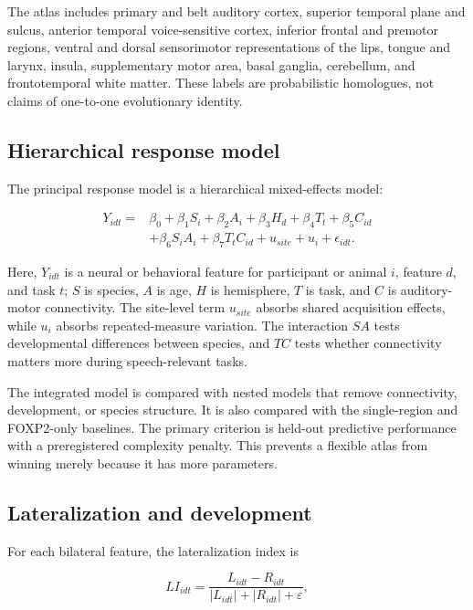 \documentclass[conference]{IEEEtran}
\begin{document}
The atlas includes primary and belt auditory cortex, superior temporal plane and sulcus, anterior temporal voice-sensitive cortex, inferior frontal and premotor regions, ventral and dorsal sensorimotor representations of the lips, tongue and larynx, insula, supplementary motor area, basal ganglia, cerebellum, and frontotemporal white matter. These labels are probabilistic homologues, not claims of one-to-one evolutionary identity.

\subsection{Hierarchical response model}

The principal response model is a hierarchical mixed-effects model:

\begin{equation}
\begin{aligned}
Y_{idt}={}&\beta_0+\beta_1 S_i+\beta_2 A_i+\beta_3 H_d+\beta_4 T_t+\beta_5 C_{id}\\
&+\beta_6 S_iA_i+\beta_7 T_tC_{id}+u_{site}+u_i+\epsilon_{idt}.
\end{aligned}
\label{eq:hierarchical}
\end{equation}

Here, $Y_{idt}$ is a neural or behavioral feature for participant or animal $i$, feature $d$, and task $t$; $S$ is species, $A$ is age, $H$ is hemisphere, $T$ is task, and $C$ is auditory-motor connectivity. The site-level term $u_{site}$ absorbs shared acquisition effects, while $u_i$ absorbs repeated-measure variation. The interaction $S A$ tests developmental differences between species, and $T C$ tests whether connectivity matters more during speech-relevant tasks.

The integrated model is compared with nested models that remove connectivity, development, or species structure. It is also compared with the single-region and FOXP2-only baselines. The primary criterion is held-out predictive performance with a preregistered complexity penalty. This prevents a flexible atlas from winning merely because it has more parameters.

\subsection{Lateralization and development}

For each bilateral feature, the lateralization index is

\begin{equation}
LI_{idt}=\frac{L_{idt}-R_{idt}}{|L_{idt}|+|R_{idt}|+\varepsilon},
\label{eq:lateralization}
\end{equation}
\end{document}
